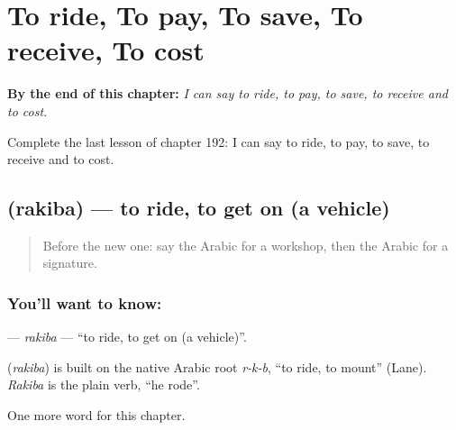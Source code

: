 
\chapter{To ride, To pay, To save, To receive, To cost}
\label{ch:ar-to-ride-to-pay-to-save-to-receive-to-cost}

\begin{chapteropening}
\textbf{By the end of this chapter:} \emph{I can say to ride, to pay, to save, to receive and to cost.}

Complete the last lesson of chapter 192: I can say to ride, to pay, to save, to receive and to cost.
\end{chapteropening}

\section[\texorpdfstring{\ar{ركب} (rakiba)}{ركب (rakiba)}]{ (rakiba) — to ride, to get on (a vehicle)}

\label{lesson:AR-C192-rakiba}



\begin{quote}
Before the new one: say the Arabic for a workshop, then the Arabic for a signature.
\end{quote}

\subsection*{You'll want to know: }
\textbf{} — \emph{rakiba} — \textquotedblleft{}to ride, to get on (a vehicle)\textquotedblright{}.

\begin{cousinweb}
\textbf{} (\emph{rakiba}) is built on the native Arabic root \emph{r-k-b}, \textquotedblleft{}to ride, to mount\textquotedblright{} (Lane). \emph{Rakiba} is the plain verb, \textquotedblleft{}he rode\textquotedblright{}.
\end{cousinweb}

\begin{grammarlens}[title={What you've built}]
One more word for this chapter.
\end{grammarlens}


